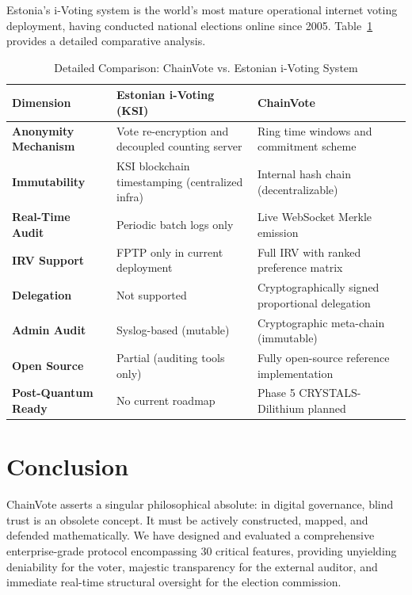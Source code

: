 \documentclass[journal,10pt,twocolumn]{IEEEtran}
\begin{document}
Estonia's i-Voting system is the world's most mature operational internet voting deployment, having conducted national elections online since 2005. Table~\ref{tab:estonia_compare} provides a detailed comparative analysis.

\begin{table}[t]
\caption{Detailed Comparison: ChainVote vs. Estonian i-Voting System}
\label{tab:estonia_compare}
\begin{tabularx}{\linewidth}{|l|X|X|}
\hline
\rowcolor{chainblue!15}
\textbf{Dimension} & \textbf{Estonian i-Voting (KSI)} & \textbf{ChainVote} \\
\hline
\textbf{Anonymity Mechanism} & Vote re-encryption and decoupled counting server & Ring time windows and commitment scheme \\
\hline
\textbf{Immutability} & KSI blockchain timestamping (centralized infra) & Internal hash chain (decentralizable) \\
\hline
\textbf{Real-Time Audit} & Periodic batch logs only & Live WebSocket Merkle emission \\
\hline
\textbf{IRV Support} & FPTP only in current deployment & Full IRV with ranked preference matrix \\
\hline
\textbf{Delegation} & Not supported & Cryptographically signed proportional delegation \\
\hline
\textbf{Admin Audit} & Syslog-based (mutable) & Cryptographic meta-chain (immutable) \\
\hline
\textbf{Open Source} & Partial (auditing tools only) & Fully open-source reference implementation \\
\hline
\textbf{Post-Quantum Ready} & No current roadmap & Phase 5 CRYSTALS-Dilithium planned \\
\hline
\end{tabularx}
\end{table}

\section{Conclusion}

ChainVote asserts a singular philosophical absolute: in digital governance, blind trust is an obsolete concept. It must be actively constructed, mapped, and defended mathematically. We have designed and evaluated a comprehensive enterprise-grade protocol encompassing 30 critical features, providing unyielding deniability for the voter, majestic transparency for the external auditor, and immediate real-time structural oversight for the election commission.
\end{document}
